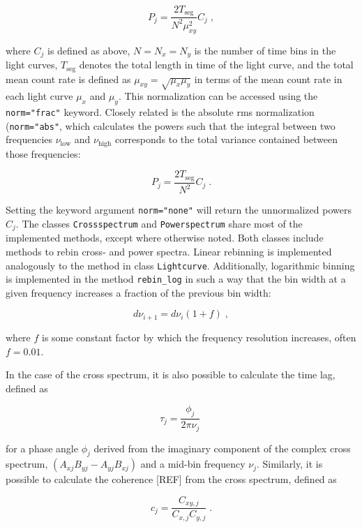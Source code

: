 \documentclass[12pt]{emulateapj}
\newcommand{\lightcurve}{\texttt{Lightcurve}\xspace}
\newcommand{\crossspectrum}{\texttt{Crossspectrum}\xspace}
\newcommand{\powerspectrum}{\texttt{Powerspectrum}\xspace}
\begin{document}
\begin{equation}
P_j = \frac{2 T_\mathrm{seg}}{N^2 \mu_{xy}^2} C_j \; ,
\end{equation}

\noindent where $C_j$ is defined as above, $N = N_x = N_y$ is the number of time bins in the light curves, $T_\mathrm{seg}$ denotes the total length in time of the light curve, and the total mean count rate is defined as $\mu_{xy} = \sqrt{\mu_x \mu_y}$ in terms of the mean count rate in each light curve $\mu_x$ and $\mu_y$. This normalization can be accessed using the \verb|norm="frac"| keyword. Closely related is the absolute rms normalization (\verb|norm="abs"|, which calculates the powers such that the integral between two frequencies $\nu_\mathrm{low}$ and $\nu_\mathrm{high}$ corresponds to the total variance contained between those frequencies:

\begin{equation}
P_j = \frac{2 T_\mathrm{seg}}{N^2} C_j \; .
\end{equation}

\noindent Setting the keyword argument \verb|norm="none"| will return the unnormalized powers $C_j$. The classes \crossspectrum and \powerspectrum share most of the implemented methods, except where otherwise noted. Both classes include methods to rebin cross- and power spectra. Linear rebinning is implemented analogously to the method in class \lightcurve. Additionally, logarithmic binning is implemented in the method \verb|rebin_log| in such a way that the bin width at a given frequency increases a fraction of the previous bin width:

\[
d\nu_{i+1} = d\nu_{i} (1 + f) \; ,
\]

\noindent where $f$ is some constant factor by which the frequency resolution increases, often $f = 0.01$. 

In the case of the cross spectrum, it is also possible to calculate the time lag, defined as

\[
\tau_j = \frac{\phi_j}{2\pi\nu_j} \; 
\]

\noindent for a phase angle $\phi_j$ derived from the imaginary component of the complex cross spectrum, $(A_{xj}B_{yj} - A_{yj}B_{xj})$ and a mid-bin frequency $\nu_j$. Similarly, it is possible to calculate the coherence [REF] from the cross spectrum, defined as 

\begin{equation}
c_j = \frac{C_{xy,j}}{C_{x,j} C_{y,j}} \; . 
\end{equation}
\end{document}
